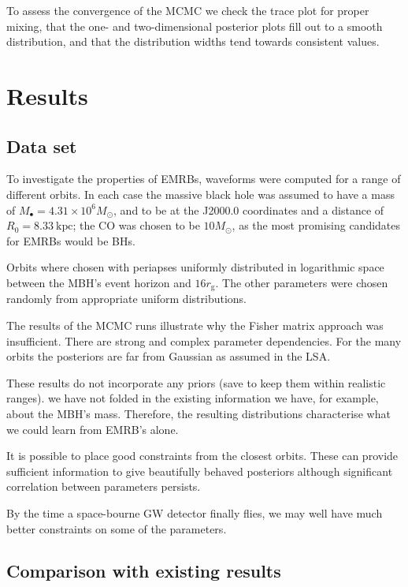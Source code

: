 \documentclass[useAMS,usedcolumn,usegraphicx,usenatbib]{mn2e}
\newcommand{\sub}[1]{\ensuremath{_\mathrm{#1}}}
\begin{document}
To assess the convergence of the MCMC we check the trace plot for proper mixing, that the one- and two-dimensional posterior plots fill out to a smooth distribution, and that the distribution widths tend towards consistent values.

\section{Results}\label{sec:Results}

\subsection{Data set}

To investigate the properties of EMRBs, waveforms were computed for a range of different orbits. In each case the massive black hole was assumed to have a mass of $M_\bullet = 4.31 \times 10^6 M_\odot$, and to be at the J2000.0 coordinates and a distance of $R_0 = 8.33~\mathrm{kpc}$; the CO was chosen to be $10 M_\odot$, as the most promising candidates for EMRBs would be BHs.

Orbits where chosen with periapses uniformly distributed in logarithmic space between the MBH's event horizon and $16 r\sub{g}$. The other parameters were chosen randomly from appropriate uniform distributions. 

The results of the MCMC runs illustrate why the Fisher matrix approach was insufficient. There are strong and complex parameter dependencies. For the many orbits the posteriors are far from Gaussian as assumed in the LSA.

These results do not incorporate any priors (save to keep them within realistic ranges). we have not folded in the existing information we have, for example, about the MBH's mass. Therefore, the resulting distributions characterise what we could learn from EMRB's alone.

It is possible to place good constraints from the closest orbits. These can provide sufficient information to give beautifully behaved posteriors although significant correlation between parameters persists.

By the time a space-bourne GW detector finally flies, we may well have much better constraints on some of the parameters.

\subsection{Comparison with existing results}
\end{document}
